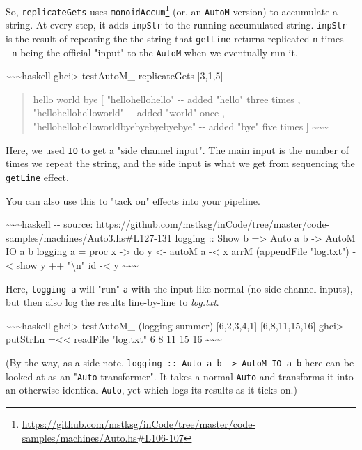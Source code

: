 \documentclass[]{article}
\renewcommand{\href}[2]{#2\footnote{\url{#1}}}
\begin{document}
So, \texttt{replicateGets} uses
\href{https://github.com/mstksg/inCode/tree/master/code-samples/machines/Auto.hs\#L106-107}{\texttt{monoidAccum}}
(or, an \texttt{AutoM} version) to accumulate a string. At every step, it adds
\texttt{inpStr} to the running accumulated string. \texttt{inpStr} is the result
of repeating the the string that \texttt{getLine} returns replicated \texttt{n}
times -\/-\/- \texttt{n} being the official "input" to the \texttt{AutoM} when
we eventually run it.

\textasciitilde{}\textasciitilde{}\textasciitilde{}haskell ghci\textgreater{}
testAutoM\_ replicateGets {[}3,1,5{]}

\begin{quote}
hello world bye {[} "hellohellohello" -\/- added "hello" three times ,
"hellohellohelloworld" -\/- added "world" once ,
"hellohellohelloworldbyebyebyebyebye" -\/- added "bye" five times {]}
\textasciitilde{}\textasciitilde{}\textasciitilde{}
\end{quote}

Here, we used \texttt{IO} to get a "side channel input". The main input is the
number of times we repeat the string, and the side input is what we get from
sequencing the \texttt{getLine} effect.

You can also use this to "tack on" effects into your pipeline.

\textasciitilde{}\textasciitilde{}\textasciitilde{}haskell -\/- source:
https://github.com/mstksg/inCode/tree/master/code-samples/machines/Auto3.hs\#L127-131
logging :: Show b =\textgreater{} Auto a b -\textgreater{} AutoM IO a b logging
a = proc x -\textgreater{} do y \textless{}- autoM a -\textless{} x arrM
(appendFile "log.txt") -\textless{} show y ++ "\textbackslash{}n" id
-\textless{} y \textasciitilde{}\textasciitilde{}\textasciitilde{}

Here, \texttt{logging\ a} will "run" \texttt{a} with the input like normal (no
side-channel inputs), but then also log the results line-by-line to
\emph{log.txt}.

\textasciitilde{}\textasciitilde{}\textasciitilde{}haskell ghci\textgreater{}
testAutoM\_ (logging summer) {[}6,2,3,4,1{]} {[}6,8,11,15,16{]}
ghci\textgreater{} putStrLn =\textless{}\textless{} readFile "log.txt" 6 8 11 15
16 \textasciitilde{}\textasciitilde{}\textasciitilde{}

(By the way, as a side note,
\texttt{logging\ ::\ Auto\ a\ b\ -\textgreater{}\ AutoM\ IO\ a\ b} here can be
looked at as an "\texttt{Auto} transformer". It takes a normal \texttt{Auto} and
transforms it into an otherwise identical \texttt{Auto}, yet which logs its
results as it ticks on.)
\end{document}
